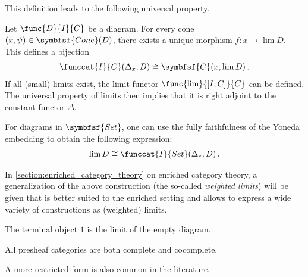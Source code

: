     This definition leads to the following universal property.
    \begin{uproperty}\label{cat:limit_uproperty}
        Let $\func{D}{I}{C}$ be a diagram. For every cone $(x,\psi)\in\symbfsf{Cone}(D)$, there exists a unique morphism $f:x\rightarrow\lim D$. This defines a bijection
        \begin{gather}
            \funccat{I}{C}(\Delta_x,D)\cong\symbfsf{C}(x,\lim D)\,.
        \end{gather}
        If all (small) limits exist, the limit functor $\func{\lim}{[I,C]}{C}$ can be defined. The universal property of limits then implies that it is right adjoint to the constant functor $\Delta$.

        For diagrams in $\symbfsf{Set}$, one can use the fully faithfulness of the Yoneda embedding to obtain the following expression:
        \begin{gather}
            \lim D\cong\funccat{I}{Set}(\Delta_\ast,D)\,.
        \end{gather}
    \end{uproperty}
    \begin{remark}
        In \cref{section:enriched_category_theory} on enriched category theory, a generalization of the above construction (the so-called \textit{weighted limits}) will be given that is better suited to the enriched setting and allows to express a wide variety of constructions as (weighted) limits.
    \end{remark}

    \begin{example}
        The terminal object $1$ is the limit of the empty diagram.
    \end{example}

    \begin{example}\label{cat:complete_presheaf_category}
        All presheaf categories are both complete and cocomplete.
    \end{example}

    A more restricted form is also common in the literature.

